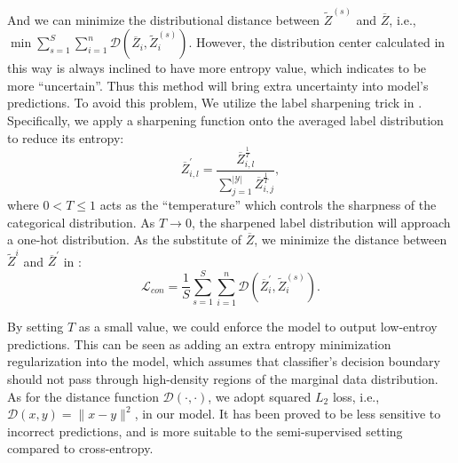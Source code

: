 {And we can minimize the distributional distance between $\widetilde{Z}^{(s)}$ and $\overline{Z}$, i.e., $\min \sum_{s=1}^{S}\sum_{i=1}^n \mathcal{D}(\overline{Z}_i, \widetilde{Z}^{(s)}_i)$.
However, the distribution center calculated in this way is always inclined to have more entropy value, which indicates to be more ``uncertain''. 
Thus this method will bring extra uncertainty into model's predictions. To avoid this problem, We utilize the label sharpening trick in \model. Specifically, we apply a sharpening function onto the averaged label distribution to reduce its entropy:
\begin{equation}
 \overline{Z}^{'}_{i,l} = \frac{\overline{Z}_{i,l}^{\frac{1}{T}}}{\sum_{j=1}^{|\mathcal{Y}|}\overline{Z}_{i,j}^{\frac{1}{T}}},
\end{equation}
where $0< T\leq 1$ acts as the ``temperature'' which controls the sharpness of the categorical distribution. As $T \to 0$, the sharpened label distribution will approach a one-hot distribution. As the substitute of $\overline{Z}$, we minimize the distance between  $\widetilde{Z}^i$ and $\overline{Z}^{'}$ in \model:
\begin{equation}
\label{equ:consistency}
    \mathcal{L}_{con} =   \frac{1}{S}\sum_{s=1}^{S}\sum_{i=1}^n \mathcal{D}(\overline{Z}^{'}_i, \widetilde{Z}^{(s)}_i).
\end{equation}

By setting $T$ as a small value, we could enforce the model to output low-entroy predictions. This can be seen as adding an extra entropy minimization regularization into the model, which assumes that classifier's decision boundary should not pass through high-density regions of the marginal data distribution\cite{grandvalet2005semi}. As for the  distance function $\mathcal{D}(\cdot, \cdot)$, we adopt squared $L_2$ loss, i.e., $\mathcal{D}(x, y)=\|x-y\|^2$, in our model. It has been proved to be less sensitive to incorrect predictions\cite{berthelot2019mixmatch}, and is more suitable to the semi-supervised setting compared to cross-entropy. 



}
